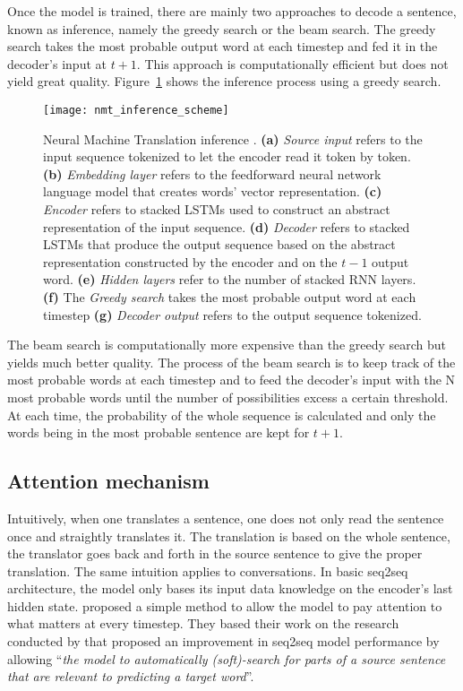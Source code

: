 Once the model is trained, there are mainly two approaches to decode a sentence, known as inference, namely the greedy search or the beam search. The greedy search takes the most probable output word at each timestep and fed it in the decoder's input at $t+1$. This approach is computationally efficient but does not yield great quality. Figure~\ref{fig:nmt-inference} shows the inference process using a greedy search.
\begin{figure}
    \centering
    \texttt{[image: nmt\_inference\_scheme]}
    \decoRule
    \caption[Neural Machine Translation inference scheme]{Neural Machine Translation inference \citep{tensorflow.nmt}. \textbf{(a)} \textit{Source input} refers to the input sequence tokenized to let the encoder read it token by token. \textbf{(b)} \textit{Embedding layer} refers to the feedforward neural network language model that creates words' vector representation. \textbf{(c)} \textit{Encoder} refers to stacked LSTMs used to construct an abstract representation of the input sequence. \textbf{(d)} \textit{Decoder} refers to stacked LSTMs that produce the output sequence based on the abstract representation constructed by the encoder and on the $t-1$ output word. \textbf{(e)} \textit{Hidden layers} refer to the number of stacked RNN layers. \textbf{(f)} The \textit{Greedy search} takes the most probable output word at each timestep  \textbf{(g)} \textit{Decoder output} refers to the output sequence tokenized.}
    \label{fig:nmt-inference}
\end{figure}

The beam search is computationally more expensive than the greedy search but yields much better quality. The process of the beam search is to keep track of the most probable words at each timestep and to feed the decoder's input with the N most probable words until the number of possibilities excess a certain threshold. At each time, the probability of the whole sequence is calculated and only the words being in the most probable sentence are kept for $t+1$.


\subsection{Attention mechanism}
Intuitively, when one translates a sentence, one does not only read the sentence once and straightly translates it. The translation is based on the whole sentence, the translator goes back and forth in the source sentence to give the proper translation. The same intuition applies to conversations.
In basic seq2seq architecture, the model only bases its input data knowledge on the encoder's last hidden state. \citet{1508.04025} proposed a simple method to allow the model to pay attention to what matters at every timestep. They based their work on the research conducted by \citet{1409.0473} that proposed an improvement in seq2seq model performance by allowing ``\textit{the model to automatically (soft)-search for parts of a source sentence that are relevant to predicting a target word}''.

